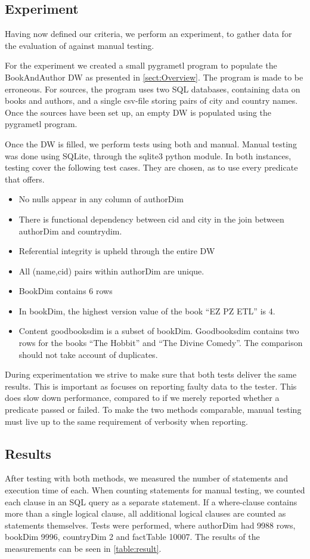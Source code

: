 \subsection{Experiment}
Having now defined our criteria, we perform an experiment, to gather data for the evaluation of \FW{} against manual testing. 

For the experiment we created a small pygrametl program to populate the BookAndAuthor DW as presented in \cref{sect:Overview}. The program is made to be erroneous. For sources, the program uses two SQL databases, containing data on books and authors, and a single csv-file storing pairs of city and country names.  Once the sources have been set up, an empty DW is populated using the pygrametl program. 

Once the DW is filled, we perform tests using both \FW{} and manual.  Manual testing was done using SQLite, through the sqlite3 python module. In both instances, testing  cover the following test cases. They are chosen, as to use every predicate that \FW{} offers.

\begin{itemize}
\item No nulls appear in any column of authorDim
\item There is functional dependency between cid and city in the join between authorDim and countrydim. 
\item Referential integrity is upheld through the entire DW
\item All (name,cid) pairs within authorDim are unique.
\item BookDim contains 6 rows
\item In bookDim, the highest version value of the book “EZ PZ ETL” is 4.
\item Content goodbooksdim is a subset of bookDim. Goodbooksdim contains two rows for the books “The Hobbit” and “The Divine Comedy”. The comparison should not take account of duplicates.
\end{itemize}

During experimentation we strive to make sure that both tests deliver the same results.  This is important as \FW{} focuses on reporting faulty data to the tester. This does slow down performance, compared to if we merely reported whether a predicate passed or failed. To make the two methods comparable, manual testing must live up to the same requirement of verbosity when reporting.

\subsection{Results}
After testing with both methods, we measured the number of statements and execution time of each. When counting statements for manual testing, we counted each clause in an SQL query as a separate statement. If a where-clause contains more than a single logical clause, all additional logical clauses are counted as statements themselves.  Tests were performed, where authorDim had 9988 rows, bookDim 9996, countryDim 2 and factTable 10007. The results of the measurements can be seen in \cref{table:result}.

